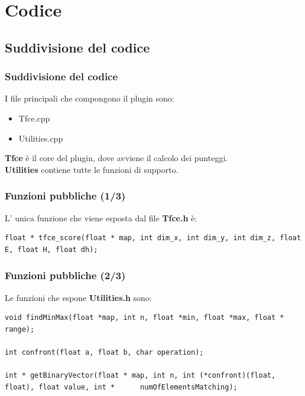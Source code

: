 \documentclass{beamer}
\begin{document}
\section{Codice}
\subsection{Suddivisione del codice}
\begin{frame}
\frametitle{Suddivisione del codice}
I file principali che compongono il plugin sono:
\begin{itemize}
\item{Tfce.cpp}
\item{Utilities.cpp}
\end{itemize}
\vfill
\textbf{Tfce} è il core del plugin, dove avviene il  calcolo dei punteggi.\\
\smallskip
\textbf{Utilities} contiene tutte le funzioni di supporto.
\end{frame}

\begin{frame}[fragile]
\frametitle{Funzioni pubbliche (1/3)}
L' unica funzione che viene esposta dal file \textbf{Tfce.h} è:
\begin{center}
\begin{lstlisting}
float * tfce_score(float * map, int dim_x, int dim_y, int dim_z, float E, float H, float dh);
\end{lstlisting}
\end{center}
\end{frame}

\begin{frame}[fragile]
\frametitle{Funzioni pubbliche (2/3)}
Le funzioni che espone \textbf{Utilities.h} sono:
\begin{center}
\begin{lstlisting}
void findMinMax(float *map, int n, float *min, float *max, float * range);

int confront(float a, float b, char operation);

int * getBinaryVector(float * map, int n, int (*confront)(float, float), float value, int *      numOfElementsMatching);
\end{lstlisting}
\end{center}
\end{frame}
\end{document}
